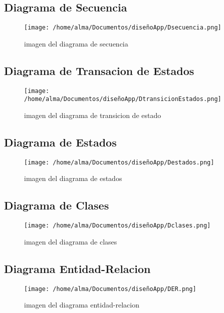 \documentclass[12pt,a4paper]{article}
\begin{document}
\subsection{Diagrama de Secuencia}
\begin{figure}[H]
    \centering
     \texttt{[image: /home/alma/Documentos/diseñoApp/Dsecuencia.png]}
    \caption{imagen del diagrama de secuencia}
    \label{fig:etiqueta}
\end{figure}

\subsection{Diagrama de Transacion de Estados}

\begin{figure}[H]
    \centering
    \texttt{[image: /home/alma/Documentos/diseñoApp/DtransicionEstados.png]}
    \caption{imagen del diagrama de transicion de estado}
    \label{fig:etiqueta}
\end{figure}

\subsection{Diagrama de Estados}

\begin{figure}[H]
    \centering
    \texttt{[image: /home/alma/Documentos/diseñoApp/Destados.png]}
    \caption{imagen del diagrama de estados}
    \label{fig:etiqueta}
\end{figure}

\subsection{Diagrama de Clases}

\begin{figure}[H]
    \centering
     \texttt{[image: /home/alma/Documentos/diseñoApp/Dclases.png]}
    \caption{imagen del diagrama de clases}
    \label{fig:etiqueta}
\end{figure}

\subsection{Diagrama Entidad-Relacion}

\begin{figure}[H]
    \centering
    \texttt{[image: /home/alma/Documentos/diseñoApp/DER.png]}
    \caption{imagen del diagrama entidad-relacion}
    \label{fig:etiqueta}
\end{figure}
\end{document}
